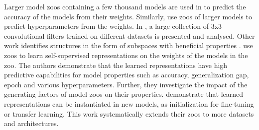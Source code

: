Larger model zoos containing a few thousand models are used in \citep{unterthinerPredictingNeuralNetwork2020} to predict the accuracy of the models from their weights. Similarly, \citep{eilertsenClassifyingClassifierDissecting2020} use zoos of larger models to predict hyperparameters from the weights.
In \citep{gavrikovCNNFilterDB2022}, a large collection of 3x3 convolutional filters trained on different datasets is presented and analysed.
% 
Other work identifies structures in the form of subspaces with beneficial properties \citep{lucasAnalyzingMonotonicLinear,wortsmanLearningNeuralNetwork2021,bentonLossSurfaceSimplexes2021}.
\citep{schurholtSelfSupervisedRepresentationLearning2021} use zoos to learn self-supervised representations on the weights of the models in the zoo. The authors demonstrate that the learned representations have high predictive capabilities for model properties such as accuracy, generalization gap, epoch and various hyperparameters. Further, they investigate the impact of the generating factors of model zoos on their properties. 
\citep{schurholtHyperRepresentationsPreTrainingTransfer2022,schurholtHyperRepresentationsGenerativeModels2022} demonstrate that learned representations can be instantiated in new models, as initialization for fine-tuning or transfer learning. 
This work systematically extends their zoos to more datasets and architectures.
%
